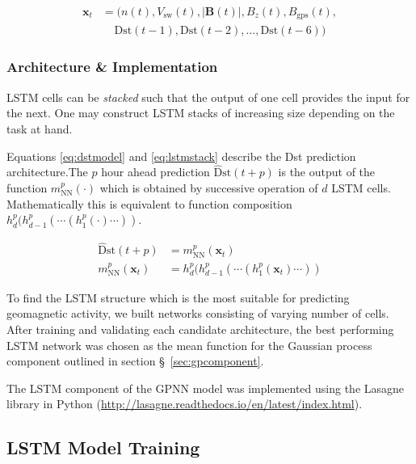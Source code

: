 \begin{equation}\label{eq:lstminputs}
	\begin{aligned}
		\mathbf{x}_t &= (n \left( t \right) , V_{\text{sw}}\left( t \right), 
		|\mathbf{B}\left( t \right)|, B_{z}\left( t \right) , B_{\text{gps}} \left( t \right),\\ 
		& \ \  \ \  \ \mathrm{Dst} \left( t-1 \right), \mathrm{Dst} \left( t-2 \right) , \ldots , 
		\mathrm{Dst} \left( t-6 \right) )
	\end{aligned}
\end{equation}

\subsubsection*{Architecture \& Implementation}

LSTM cells can be \emph{stacked} such that the output of one cell provides the input for the next. 
One may construct LSTM stacks of increasing size depending on the task at hand.  

Equations \ref{eq:dstmodel} and \ref{eq:lstmstack} describe the Dst prediction architecture.The $p$ hour 
ahead prediction $\mathrm{\hat{D}st} \left(t + p \right)$ is the output of the function $m^{p}_{\text{NN}}(\cdot)$ which 
is obtained by successive operation of $d$ LSTM cells. Mathematically this is equivalent to function composition 
$h^{p}_{d} ( h^{p}_{d-1}( \cdots (h^{p}_{1}(\cdot)\cdots))$.

\begin{align}
	\mathrm{\hat{D}st} \left(t + p \right) &= 
	m^{p}_{\text{NN}} (\mathbf{x}_t) \label{eq:dstmodel}\\
	m^{p}_{\text{NN}} (\mathbf{x}_t) &= 
	h^{p}_{d} ( h^{p}_{d-1}( \cdots (h^{p}_{1}(\mathbf{x}_t)\cdots)) \label{eq:lstmstack}
\end{align}

To find the LSTM structure which is the most suitable for predicting geomagnetic activity, we 
built networks consisting of varying number of cells. After training and validating each candidate architecture, 
the best performing LSTM network was chosen as the mean function for the Gaussian process component outlined in 
section \S~\ref{sec:gpcomponent}.

The LSTM component of the GPNN model was implemented using the Lasagne library in Python 
(\url{http://lasagne.readthedocs.io/en/latest/index.html}). 

\subsection{LSTM Model Training}


